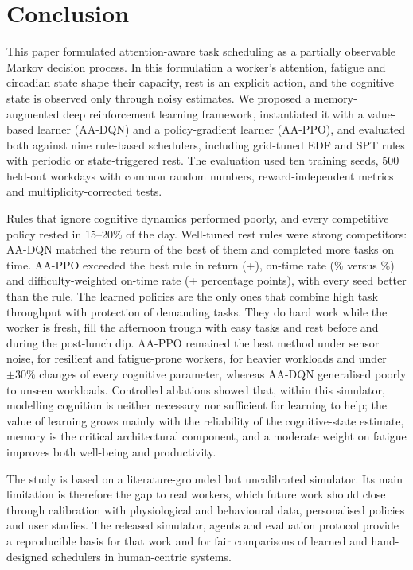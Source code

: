 \section{Conclusion}\label{sec:conclusion}
This paper formulated attention-aware task scheduling as a partially observable Markov decision process. In this formulation a worker's attention, fatigue and circadian state shape their capacity, rest is an explicit action, and the cognitive state is observed only through noisy estimates. We proposed a memory-augmented deep reinforcement learning framework, instantiated it with a value-based learner (AA-DQN) and a policy-gradient learner (AA-PPO), and evaluated both against nine rule-based schedulers, including grid-tuned EDF and SPT rules with periodic or state-triggered rest. The evaluation used ten training seeds, 500 held-out workdays with common random numbers, reward-independent metrics and multiplicity-corrected tests.

Rules that ignore cognitive dynamics performed poorly, and every competitive policy rested in 15--20\% of the day. Well-tuned rest rules were strong competitors: AA-DQN matched the return of the best of them and completed more tasks on time. AA-PPO exceeded the best rule in return (+\PpoRetSPTThreshold), on-time rate (\PPOOnTimePct\% versus \bestHeurOnTimePct\%) and difficulty-weighted on-time rate (+\PpoWOnSPTThreshold{} percentage points), with every seed better than the rule. The learned policies are the only ones that combine high task throughput with protection of demanding tasks. They do hard work while the worker is fresh, fill the afternoon trough with easy tasks and rest before and during the post-lunch dip. AA-PPO remained the best method under sensor noise, for resilient and fatigue-prone workers, for heavier workloads and under $\pm30\%$ changes of every cognitive parameter, whereas AA-DQN generalised poorly to unseen workloads. Controlled ablations showed that, within this simulator, modelling cognition is neither necessary nor sufficient for learning to help; the value of learning grows mainly with the reliability of the cognitive-state estimate, memory is the critical architectural component, and a moderate weight on fatigue improves both well-being and productivity.

The study is based on a literature-grounded but uncalibrated simulator. Its main limitation is therefore the gap to real workers, which future work should close through calibration with physiological and behavioural data, personalised policies and user studies. The released simulator, agents and evaluation protocol provide a reproducible basis for that work and for fair comparisons of learned and hand-designed schedulers in human-centric systems.
